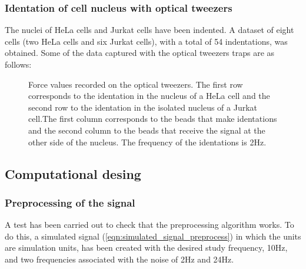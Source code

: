 \documentclass[12pt, a4paper]{article} %
\begin{document}
\setlength{\parskip}{0mm}

\subsubsection{Identation of cell nucleus with optical tweezers}

The nuclei of HeLa cells and Jurkat cells have been indented. A dataset of eight cells (two HeLa cells and six Jurkat cells), with a total of 54 indentations, was obtained. Some of the data captured with the optical tweezers traps are as follows:

\setlength{\parskip}{4mm}

\begin{figure}[htbp]
	\centering
	
	\caption{Force values recorded on the optical tweezers. The first row corresponds to the identation in the nucleus of a HeLa cell and the second row to the identation in the isolated nucleus of a Jurkat cell.The first column corresponds to the beads that make identations and the second column to the beads that receive the signal at the other side of the nucleus. The frequency of the identations is 2Hz.}
	\label{fig:raw_data_cells}
\end{figure}

\setlength{\parskip}{0mm}

\subsection{Computational desing}

\subsubsection{Preprocessing of the signal}

A test has been carried out to check that the preprocessing algorithm works. To do this, a simulated signal (\ref{eqn:simulated_signal_preprocess}) in which the units are simulation units, has been created with the desired study frequency, 10Hz, and two frequencies associated with the noise of 2Hz and 24Hz. 
\end{document}
